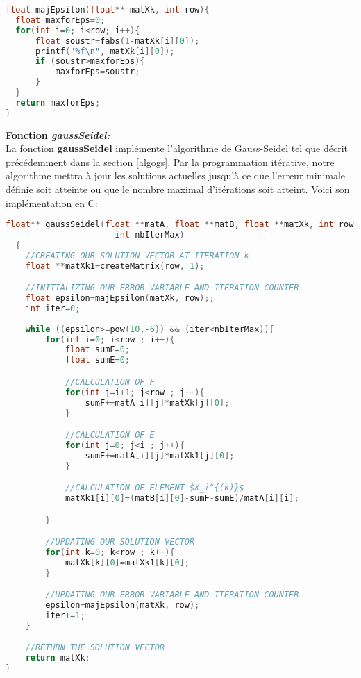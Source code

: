 \begin{lstlisting}[language=C,inputencoding=utf8, basicstyle=\fontsize{8}{10}\selectfont]
float majEpsilon(float** matXk, int row){
  float maxforEps=0;
  for(int i=0; i<row; i++){
      float soustr=fabs(1-matXk[i][0]);
      printf("%f\n", matXk[i][0]);
      if (soustr>maxforEps){
          maxforEps=soustr;
      }
  }
  return maxforEps;
}
\end{lstlisting}
\textbf{\underline{Fonction \textit{gaussSeidel:}}}\vspace{6pt}\\
La fonction \textbf{gaussSeidel} implémente l'algorithme de Gauss-Seidel tel que décrit précédemment dans la section \ref{algogs}. Par la programmation itérative, notre algorithme mettra à jour les solutions actuelles jusqu'à ce que l'erreur minimale définie soit atteinte ou que le nombre maximal d'itérations soit atteint. Voici son implémentation en C:

\begin{lstlisting}[mathescape=true, language=C,inputencoding=utf8, basicstyle=\fontsize{8}{10}\selectfont]
  float** gaussSeidel(float **matA, float **matB, float **matXk, int row, int column, 
                      int nbIterMax)
  {
    //CREATING OUR SOLUTION VECTOR AT ITERATION k
    float **matXk1=createMatrix(row, 1);

    //INITIALIZING OUR ERROR VARIABLE AND ITERATION COUNTER
    float epsilon=majEpsilon(matXk, row);;
    int iter=0;
    
    while ((epsilon>=pow(10,-6)) && (iter<nbIterMax)){
        for(int i=0; i<row ; i++){
            float sumF=0;
            float sumE=0;

            //CALCULATION OF F
            for(int j=i+1; j<row ; j++){
                sumF+=matA[i][j]*matXk[j][0];
            }

            //CALCULATION OF E
            for(int j=0; j<i ; j++){
                sumE+=matA[i][j]*matXk1[j][0];
            }

            //CALCULATION OF ELEMENT $X_i^{(k)}$
            matXk1[i][0]=(matB[i][0]-sumF-sumE)/matA[i][i];

        }

        //UPDATING OUR SOLUTION VECTOR
        for(int k=0; k<row ; k++){
            matXk[k][0]=matXk1[k][0];
        }

        //UPDATING OUR ERROR VARIABLE AND ITERATION COUNTER
        epsilon=majEpsilon(matXk, row);
        iter+=1;
    }

    //RETURN THE SOLUTION VECTOR
    return matXk;
}
\end{lstlisting}
